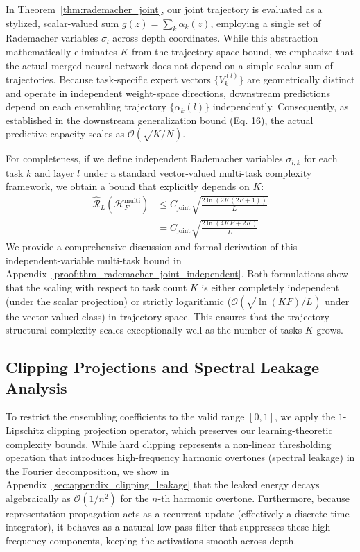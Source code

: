 \begin{remark}
In Theorem~\ref{thm:rademacher_joint}, our joint trajectory is evaluated as a stylized, scalar-valued sum $g(z) = \sum_k \alpha_k(z)$, employing a single set of Rademacher variables $\sigma_l$ across depth coordinates. While this abstraction mathematically eliminates $K$ from the trajectory-space bound, we emphasize that the actual merged neural network does not depend on a simple scalar sum of trajectories. Because task-specific expert vectors $\{V_k^{(l)}\}$ are geometrically distinct and operate in independent weight-space directions, downstream predictions depend on each ensembling trajectory $\{\alpha_k(l)\}$ independently. Consequently, as established in the downstream generalization bound (Eq. 16), the actual predictive capacity scales as $\mathcal{O}(\sqrt{K/N})$.

For completeness, if we define independent Rademacher variables $\sigma_{l,k}$ for each task $k$ and layer $l$ under a standard vector-valued multi-task complexity framework, we obtain a bound that explicitly depends on $K$:
\begin{align}
    \widehat{\mathcal{R}}_L(\boldsymbol{\mathcal{H}}_F^{\text{multi}}) &\le C_{\text{joint}} \sqrt{\frac{2 \ln(2K(2F+1))}{L}} \nonumber \\
    &= C_{\text{joint}} \sqrt{\frac{2 \ln(4KF+2K)}{L}}
\end{align}
We provide a comprehensive discussion and formal derivation of this independent-variable multi-task bound in Appendix~\ref{proof:thm_rademacher_joint_independent}. Both formulations show that the scaling with respect to task count $K$ is either completely independent (under the scalar projection) or strictly logarithmic ($\mathcal{O}(\sqrt{\ln(KF)/L})$ under the vector-valued class) in trajectory space. This ensures that the trajectory structural complexity scales exceptionally well as the number of tasks $K$ grows.
\end{remark}

\subsection{Clipping Projections and Spectral Leakage Analysis}
To restrict the ensembling coefficients to the valid range $[0, 1]$, we apply the $1$-Lipschitz clipping projection operator, which preserves our learning-theoretic complexity bounds. While hard clipping represents a non-linear thresholding operation that introduces high-frequency harmonic overtones (spectral leakage) in the Fourier decomposition, we show in Appendix~\ref{sec:appendix_clipping_leakage} that the leaked energy decays algebraically as $\mathcal{O}(1/n^2)$ for the $n$-th harmonic overtone. Furthermore, because representation propagation acts as a recurrent update (effectively a discrete-time integrator), it behaves as a natural low-pass filter that suppresses these high-frequency components, keeping the activations smooth across depth.

